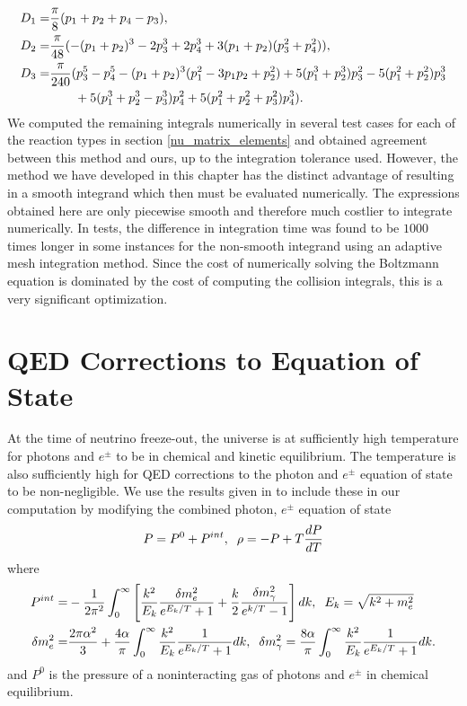 \begin{subappendices}
\begin{align}
D_1=&\frac{\pi}{8}(p_1+p_2+p_4-p_3),\\
D_2=&\frac{\pi}{48}(-(p_1+p_2)^3-2p_3^3+2p_4^3+3(p_1+p_2)(p_3^2+p_4^2)),\\
D_3=&\frac{\pi}{240}(p_3^5-p_4^5-(p_1+p_2)^3(p_1^2-3p_1p_2+p_2^2)+5(p_1^3+p_2^3)p_3^2-5(p_1^2+p_2^2)p_3^3\\
&\hspace{7mm}+5(p_1^3+p_2^3-p_3^3)p_4^2+5(p_1^2+p_2^2+p_3^2)p_4^3).\notag
\end{align}
We computed the remaining integrals numerically in several test cases for each of the reaction types in section \ref{nu_matrix_elements} and obtained agreement between this method and ours, up to the integration tolerance used.  However, the method we have developed in this chapter has the distinct advantage of resulting in a smooth integrand which then must be evaluated numerically.  The expressions obtained here are only piecewise smooth and therefore much costlier to integrate numerically.  In tests, the difference in integration time was found to be $1000$ times longer in some instances for the non-smooth integrand using an adaptive mesh integration method.  Since the cost of numerically solving the Boltzmann equation is dominated by the cost of computing the collision integrals, this is a very significant optimization.

\section{QED Corrections to Equation of State}\label{app:QED_corr}
At the time of neutrino freeze-out, the universe is at sufficiently high temperature for photons and $e^\pm$ to be in chemical and kinetic equilibrium.  The temperature is also sufficiently high for QED corrections to the photon and $e^\pm$ equation of state to be non-negligible.  We use the results given in \cite{Heckler:1994tv,Mangano2002} to include these in our computation by modifying the combined photon, $e^\pm$ equation of state
\begin{align}
P=P^0+P^{int},\hspace{2mm} \rho=-P+T\frac{dP}{dT}
\end{align}
where
\begin{align}
P^{int}=&-\frac{1}{2\pi^2}\int_0^\infty\left[\frac{k^2}{E_k}\frac{\delta m_e^2}{e^{E_k/T}+1}+\frac{k}{2}\frac{\delta m_\gamma^2}{e^{k/T}-1}\right]dk,\hspace{2mm} E_k=\sqrt{k^2+m_e^2}\\
\delta m_e^2=&\frac{2\pi\alpha^2}{3}+\frac{4\alpha}{\pi}\int_0^\infty \frac{k^2}{E_k}\frac{1}{e^{E_k/T}+1}dk,\hspace{2mm} \delta m_\gamma^2=\frac{8\alpha}{\pi}\int_0^\infty \frac{k^2}{E_k}\frac{1}{e^{E_k/T}+1}dk.
\end{align}
and $P^0$ is the pressure of a noninteracting gas of photons and $e^\pm$ in chemical equilibrium.



\end{subappendices}
